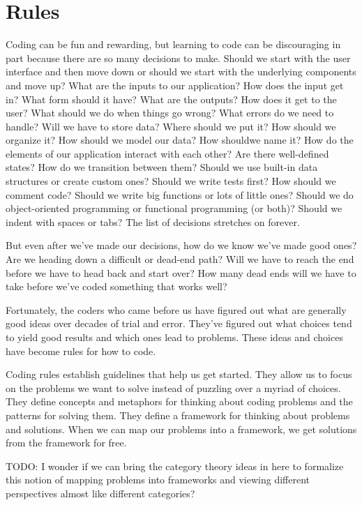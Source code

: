 \chapter{Rules}
Coding can be fun and rewarding, but learning to code can be discouraging in
part because there are so many decisions to make. Should we start with the user
interface and then move down or should we start with the underlying components
and move up? What are the inputs to our application? How does the input get in?
What form should it have? What are the outputs? How does it get to the user?
What should we do when things go wrong? What errors do we need to handle? Will
we have to store data? Where should we put it? How should we organize it? How
should we model our data? How shouldwe name it? How do the elements of our
application interact with each other? Are there well-defined states? How do we
transition between them? Should we use built-in data structures or create
custom ones? Should we write tests first? How should we comment code? Should we
write big functions or lots of little ones? Should we do object-oriented
programming or functional programming (or both)? Should we indent with spaces
or tabs? The list of decisions stretches on forever.

But even after we've made our decisions, how do we know we've made good ones?
Are we heading down a difficult or dead-end path? Will we have to reach the end
before we have to head back and start over? How many dead ends will we have to
take before we've coded something that works well?

Fortunately, the coders who came before us have figured out what are generally
good ideas over decades of trial and error. They've figured out what choices
tend to yield good results and which ones lead to problems. These ideas and
choices have become rules for how to code.

Coding rules establish guidelines that help us get started. They allow us to
focus on the problems we want to solve instead of puzzling over a myriad of
choices. They define concepts and metaphors for thinking about coding problems
and the patterns for solving them. They define a framework for thinking about
problems and solutions. When we can map our problems into a framework, we get
solutions from the framework for free.

\begin{framed}
\noindent TODO: I wonder if we can bring the category theory ideas in here to formalize
this notion of mapping problems into frameworks and viewing different
perspectives almost like different categories?
\end{framed}

